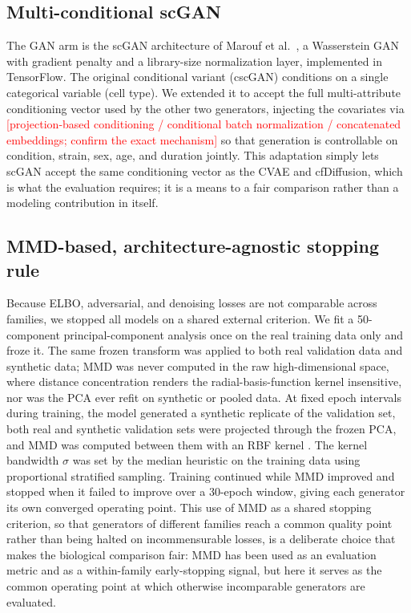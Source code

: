 \documentclass[11pt]{article}
\newcommand{\res}[1]{\textcolor{red}{[#1]}}
\begin{document}
\subsection{Multi-conditional scGAN}
The GAN arm is the scGAN architecture of Marouf et al.\ \cite{scgan}, a Wasserstein GAN with gradient penalty and a library-size normalization layer, implemented in TensorFlow. The original conditional variant (cscGAN) conditions on a single categorical variable (cell type). We extended it to accept the full multi-attribute conditioning vector used by the other two generators, injecting the covariates via \res{projection-based conditioning / conditional batch normalization / concatenated embeddings; confirm the exact mechanism} so that generation is controllable on condition, strain, sex, age, and duration jointly. This adaptation simply lets scGAN accept the same conditioning vector as the CVAE and cfDiffusion, which is what the evaluation requires; it is a means to a fair comparison rather than a modeling contribution in itself.

\subsection{MMD-based, architecture-agnostic stopping rule}
Because ELBO, adversarial, and denoising losses are not comparable across families, we stopped all models on a shared external criterion. We fit a 50-component principal-component analysis once on the real training data only and froze it. The same frozen transform was applied to both real validation data and synthetic data; MMD was never computed in the raw high-dimensional space, where distance concentration renders the radial-basis-function kernel insensitive, nor was the PCA ever refit on synthetic or pooled data. At fixed epoch intervals during training, the model generated a synthetic replicate of the validation set, both real and synthetic validation sets were projected through the frozen PCA, and MMD was computed between them with an RBF kernel \cite{gretton,sutherland}. The kernel bandwidth $\sigma$ was set by the median heuristic on the training data using proportional stratified sampling. Training continued while MMD improved and stopped when it failed to improve over a 30-epoch window, giving each generator its own converged operating point. This use of MMD as a shared stopping criterion, so that generators of different families reach a common quality point rather than being halted on incommensurable losses, is a deliberate choice that makes the biological comparison fair: MMD has been used as an evaluation metric \cite{gretton,sutherland} and as a within-family early-stopping signal, but here it serves as the common operating point at which otherwise incomparable generators are evaluated.
\end{document}
